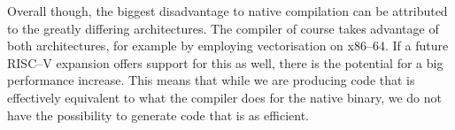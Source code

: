 Overall though, the biggest disadvantage to native compilation can be attributed to the greatly differing architectures.
The compiler of course takes advantage of both architectures, for example  by employing vectorisation on x86--64.
If a future RISC--V expansion offers support for this as well, there is the potential for a big performance increase.
This means that while we are producing code that is effectively equivalent to what the compiler does for the native binary, we do not have the possibility to generate code that is as efficient.



















